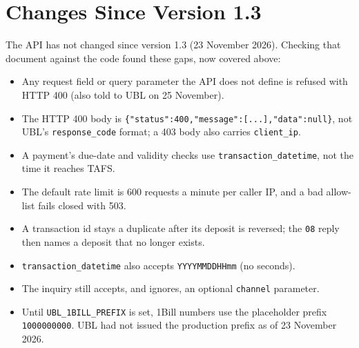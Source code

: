 \documentclass[11pt]{article}
\begin{document}
\section{Changes Since Version 1.3}
The API has not changed since version 1.3 (23 November 2026). Checking that document against the code found these
gaps, now covered above:
\begin{itemize}[nosep]
  \item Any request field or query parameter the API does not define is refused with HTTP 400 (also told to UBL on
        25 November).
  \item The HTTP 400 body is \texttt{\{"status":400,"message":[...],"data":null\}}, not UBL's \texttt{response\_code}
        format; a 403 body also carries \texttt{client\_ip}.
  \item A payment's due-date and validity checks use \texttt{transaction\_datetime}, not the time it reaches TAFS.
  \item The default rate limit is 600 requests a minute per caller IP, and a bad allow-list fails closed with 503.
  \item A transaction id stays a duplicate after its deposit is reversed; the \texttt{08} reply then names a deposit
        that no longer exists.
  \item \texttt{transaction\_datetime} also accepts \texttt{YYYYMMDDHHmm} (no seconds).
  \item The inquiry still accepts, and ignores, an optional \texttt{channel} parameter.
  \item Until \texttt{UBL\_1BILL\_PREFIX} is set, 1Bill numbers use the placeholder prefix \texttt{1000000000}. UBL had
        not issued the production prefix as of 23 November 2026.
\end{itemize}
\end{document}
